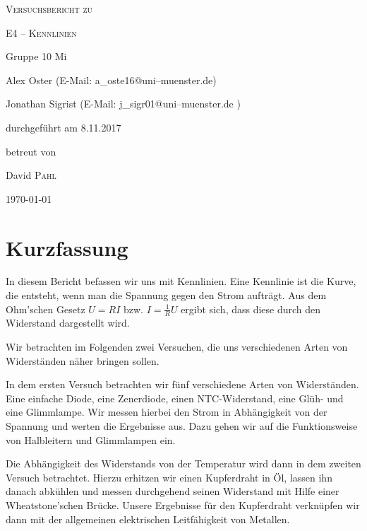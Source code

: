 \documentclass[11pt,a4paper,titlepage, ngerman]{article}
\begin{document}
	
	\begin{titlepage}
		\centering
		{\scshape\LARGE Versuchsbericht zu \par}
		\vspace{1cm}
		{\scshape\huge E4 -- Kennlinien\par}
		\vspace{2.5cm}
		{\LARGE Gruppe 10 Mi\par}
		\vspace{0.5cm}
		{\large Alex Oster (E-Mail: a\_oste16@uni--muenster.de) \par}
		{\large Jonathan Sigrist (E-Mail: j\_sigr01@uni--muenster.de ) \par}
		\vfill
		durchgeführt am 8.11.2017\par
		betreut von\par
		{\large David \textsc{Pahl}}
		
		\vfill
		
		{\large \today\par}
	\end{titlepage}
		
	\tableofcontents
	
	\newpage
	
	\section{Kurzfassung}
		
		In diesem Bericht befassen wir uns mit Kennlinien. Eine Kennlinie ist die Kurve, die entsteht, wenn man die Spannung gegen den Strom aufträgt. Aus dem Ohm'schen Gesetz $U=RI$ bzw. $I = \frac{1}{R}U $ ergibt sich, dass diese durch den Widerstand dargestellt wird. 
		
		Wir betrachten im Folgenden zwei Versuchen, die uns verschiedenen Arten von Widerständen näher bringen sollen. 
		
		In dem ersten Versuch betrachten wir fünf verschiedene Arten von Widerständen. Eine einfache Diode, eine Zenerdiode, einen NTC-Widerstand, eine Glüh- und eine Glimmlampe. Wir messen hierbei den Strom in Abhängigkeit von der Spannung und werten die Ergebnisse aus. Dazu gehen wir auf die Funktionsweise von Halbleitern und Glimmlampen ein. 
		
		Die Abhängigkeit des Widerstands von der Temperatur wird dann in dem zweiten Versuch betrachtet.
		Hierzu erhitzen wir einen Kupferdraht in Öl, lassen ihn danach abkühlen und messen durchgehend seinen Widerstand mit Hilfe einer Wheatstone'schen Brücke. Unsere Ergebnisse für den Kupferdraht verknüpfen wir dann mit der allgemeinen elektrischen Leitfähigkeit von Metallen.
\end{document}
